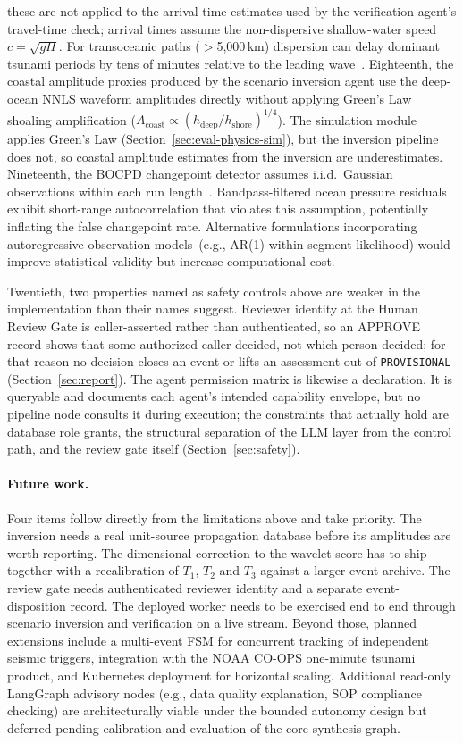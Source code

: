 \documentclass{article}
\begin{document}
these are not applied to the arrival-time estimates used by the
verification agent's travel-time check; arrival times assume the
non-dispersive shallow-water speed $c = \sqrt{gH}$.  For
transoceanic paths ($>$5{,}000\,km) dispersion can delay dominant
tsunami periods by tens of minutes relative to the
leading wave~\citep{kajiura1963leading}.
Eighteenth, the coastal amplitude proxies produced by the scenario
inversion agent use the deep-ocean NNLS waveform amplitudes directly
without applying Green's Law shoaling amplification
($A_\text{coast} \propto (h_\text{deep}/h_\text{shore})^{1/4}$).
The simulation module applies Green's Law (Section~\ref{sec:eval-physics-sim}),
but the inversion pipeline does not, so coastal amplitude estimates
from the inversion are underestimates.
Nineteenth, the BOCPD changepoint detector assumes i.i.d.\ Gaussian
observations within each run length~\citep{adams2007bayesian}.
Bandpass-filtered ocean pressure residuals exhibit short-range
autocorrelation that violates this assumption, potentially inflating
the false changepoint rate.  Alternative formulations incorporating
autoregressive observation models~(e.g., AR(1) within-segment likelihood)
would improve statistical validity but increase computational cost.

Twentieth, two properties named as safety controls above are weaker in
the implementation than their names suggest.  Reviewer identity at the
Human Review Gate is caller-asserted rather than authenticated, so an
APPROVE record shows that some authorized caller decided, not which
person decided; for that reason no decision closes an event or lifts
an assessment out of \texttt{PROVISIONAL}
(Section~\ref{sec:report}).  The agent permission matrix is likewise a
declaration.  It is queryable and documents each agent's intended
capability envelope, but no pipeline node consults it during
execution; the constraints that actually hold are database role
grants, the structural separation of the LLM layer from the control
path, and the review gate itself (Section~\ref{sec:safety}).

\paragraph{Future work.}
Four items follow directly from the limitations above and take
priority.  The inversion needs a real unit-source propagation database
before its amplitudes are worth reporting.  The dimensional correction
to the wavelet score has to ship together with a recalibration of
$T_1$, $T_2$ and $T_3$ against a larger event archive.  The review
gate needs authenticated reviewer identity and a separate
event-disposition record.  The deployed worker needs to be exercised
end to end through scenario inversion and verification on a live
stream.  Beyond those, planned extensions include a multi-event FSM
for concurrent tracking of independent seismic triggers, integration
with the NOAA CO-OPS one-minute tsunami product, and Kubernetes
deployment for horizontal scaling.
Additional read-only LangGraph advisory nodes (e.g., data quality
explanation, SOP compliance checking) are architecturally viable under
the bounded autonomy design but deferred pending calibration and
evaluation of the core synthesis graph.
\end{document}
